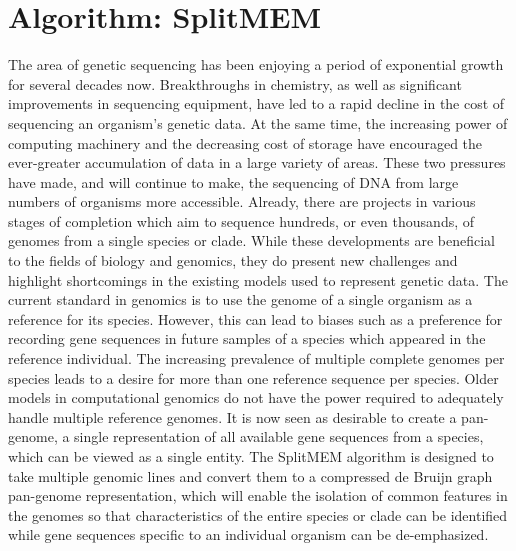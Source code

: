 \documentclass[11pt]{article}
\begin{document}
\section{Algorithm: SplitMEM}
The area of genetic sequencing has been enjoying a period of exponential
growth for several decades now. Breakthroughs in chemistry, as well as 
significant improvements in sequencing equipment, have led to a rapid 
decline in the cost of sequencing an organism's genetic data. At the 
same time, the increasing power of computing machinery and the decreasing
cost of storage have encouraged the ever-greater accumulation of data in 
a large variety of areas. These two pressures have made, and will 
continue to make, the sequencing of DNA from large numbers of organisms 
more accessible. Already, there are projects in various stages of 
completion which aim to sequence hundreds, or even thousands, of genomes 
from a single species or clade\cite{Haussler08}\cite{1000genomes}\cite{1001genomes}\cite{100KProject}. 
While these developments are beneficial 
to the fields of biology and genomics, they do present new challenges 
and highlight shortcomings in the existing models used to represent 
genetic data. The current standard in genomics is to use the genome of a 
single organism as a reference for its species. However, this can lead to
biases such as a preference for recording gene sequences in future samples
of a species which appeared in the reference individual. The increasing prevalence
of multiple complete genomes per species leads to a desire for more than
one reference sequence per species. Older models in computational 
genomics do not have the power required to adequately handle multiple 
reference genomes. It is now seen as desirable to create a pan-genome, 
a single representation of all available gene sequences from a species, 
which can be viewed as a single entity. The SplitMEM algorithm is 
designed to take multiple genomic lines and convert them to a compressed
de Bruijn graph pan-genome representation, which will enable the 
isolation of common features in the genomes so that characteristics 
of the entire species or clade can be identified while gene sequences 
specific to an individual organism can be de-emphasized\cite{Marcus14}.
\end{document}
